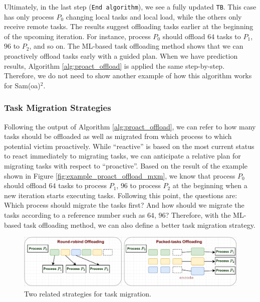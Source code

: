 Ultimately, in the last step (\texttt{End algorithm}), we see a fully updated \texttt{TB}. This case has only process $P_{0}$ changing local tasks and local load, while the others only receive remote tasks. The results suggest offloading tasks earlier at the beginning of the upcoming iteration. For instance, process $P_{0}$ should offload $64$ tasks to $P_{1}$, $96$ to $P_{2}$, and so on. The ML-based task offloading method shows that we can proactively offload tasks early with a guided plan. When we have prediction results, Algorithm \ref{alg:proact_offload} is applied the same step-by-step. Therefore, we do not need to show another example of how this algorithm works for Sam(oa)$^2$.

\subsubsection{Task Migration Strategies}
\label{subsubsec:migration-strategies}

Following the output of Algorithm \ref{alg:proact_offload}, we can refer to how many tasks should be offloaded as well as migrated from which process to which potential victim proactively. While ``reactive'' is based on the most current status to react immediately to migrating tasks, we can anticipate a relative plan for migrating tasks with respect to ``proactive''. Based on the result of the example shown in Figure \ref{fig:example_proact_offload_mxm}, we know that process $P_{0}$ should offload $64$ tasks to process $P_{1}$, $96$ to process $P_{2}$ at the beginning when a new iteration starts executing tasks. Following this point, the questions are: Which process should migrate the tasks first? And how should we migrate the tasks according to a reference number such as $64$, $96$? Therefore, with the ML-based task offloading method, we can also define a better task migration strategy.\\

\begin{figure}[t]
  \centering
  \includegraphics[scale=0.7]{./pictures/padlb_approach/padlb_migration_strategies.pdf}
	\caption{Two related strategies for task migration.}
	\label{fig:two_migration_strategies}
\end{figure}

